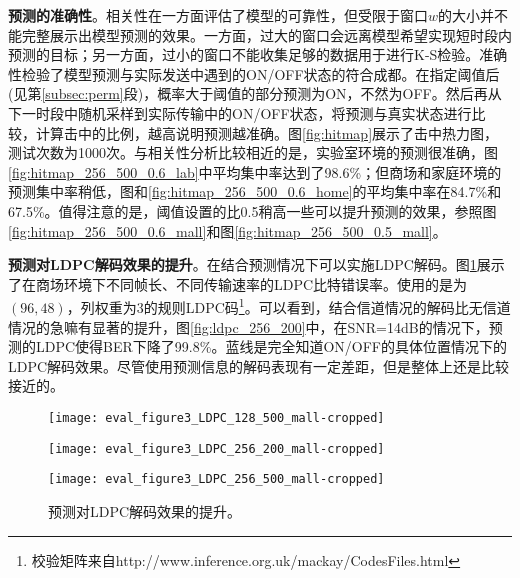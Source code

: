 \textbf{预测的准确性}。相关性在一方面评估了模型的可靠性，但受限于窗口$w$的大小并不能完整展示出模型预测的效果。一方面，过大的窗口会远离模型希望实现短时段内预测的目标；另一方面，过小的窗口不能收集足够的数据用于进行K-S检验。准确性检验了模型预测与实际发送中遇到的ON/OFF状态的符合成都。在指定阈值后(见第\ref{subsec:perm}段)，概率大于阈值的部分预测为ON，不然为OFF。然后再从下一时段中随机采样到实际传输中的ON/OFF状态，将预测与真实状态进行比较，计算击中的比例，越高说明预测越准确。图\ref{fig:hitmap}展示了击中热力图，测试次数为1000次。与相关性分析比较相近的是，实验室环境的预测很准确，图\ref{fig:hitmap_256_500_0.6_lab}中平均集中率达到了98.6\%；但商场和家庭环境的预测集中率稍低，图和\ref{fig:hitmap_256_500_0.6_home}的平均集中率在84.7\%和67.5\%。值得注意的是，阈值设置的比0.5稍高一些可以提升预测的效果，参照图\ref{fig:hitmap_256_500_0.6_mall}和图\ref{fig:hitmap_256_500_0.5_mall}。


\textbf{预测对LDPC解码效果的提升}。在结合预测情况下可以实施LDPC解码。图\ref{fig:ldpc}展示了在商场环境下不同帧长、不同传输速率的LDPC比特错误率。使用的是为$(96,48)$，列权重为$3$的规则LDPC码\footnote{校验矩阵来自http://www.inference.org.uk/mackay/CodesFiles.html}。可以看到，结合信道情况的解码比无信道情况的急嘛有显著的提升，图\ref{fig:ldpc_256_200}中，在SNR=14dB的情况下，预测的LDPC使得BER下降了99.8\%。蓝线是完全知道ON/OFF的具体位置情况下的LDPC解码效果。尽管使用预测信息的解码表现有一定差距，但是整体上还是比较接近的。
\begin{figure}[t]
	\begin{minipage}[b]{.32\linewidth}
		\texttt{[image: eval\_figure3\_LDPC\_128\_500\_mall-cropped]}
		\label{fig:ldpc_128_500}
	\end{minipage}
	\hfill
	\begin{minipage}[b]{.32\linewidth}
		\texttt{[image: eval\_figure3\_LDPC\_256\_200\_mall-cropped]}
		\label{fig:ldpc_256_200}
	\end{minipage}
	\hfill
	\begin{minipage}[b]{.32\linewidth}
		\texttt{[image: eval\_figure3\_LDPC\_256\_500\_mall-cropped]}
		\label{fig:ldpc_256_500}
	\end{minipage}
	\caption{预测对LDPC解码效果的提升。}\label{fig:ldpc}
\end{figure}

